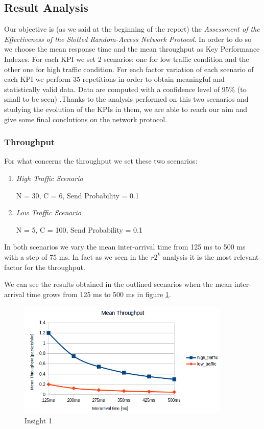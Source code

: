 \subsection{Result Analysis}
Our objective is (as we said at the beginning of the report) the \textit{Assessment of the Effectiveness of the Slotted Random-Access Network Protocol}. In order to do so we choose the mean response time and the mean throughput as Key Performance Indexes. For each KPI we set 2 scenarios: one for low traffic condition and the other one for high traffic condition. For each factor variation of each scenario of each KPI we perform 35 repetitions in order to obtain meaningful and statistically valid data. Data are computed with a confidence level of 95\% (to small to be seen) .Thanks to the analysis performed on this two scenarios and studying the evolution of the KPIs in them, we are able to reach our aim and give some final conclutions on the network protocol. 

\subsubsection{Throughput}
For what concerns the throughput we set these two scenarios:
\begin{enumerate}
	\item \textit{High Traffic Scenario}
	
	N = 30, C = 6, Send Probability = 0.1
	\item \textit{Low Traffic Scenario}
	
	N = 5, C = 100, Send Probability = 0.1
\end{enumerate}

\noindent In both scenarios we vary the mean inter-arrival time from 125 ms to 500 ms with a step of 75 ms. In fact as we seen in the $r2^k$ analysis it is the most relevant factor for the throughput. 

\noindent We can see the results obtained in the outlined scenarios when the mean inter-arrival time grows from 125 ms to 500 ms in figure \ref{img: insight1_throughput}.

\begin{figure}[H]
	\centering
	\includegraphics[width=0.9\textwidth]{img/insight1_throughput.png}
	\caption{Insight 1}
	\label{img: insight1_throughput}
\end{figure}

